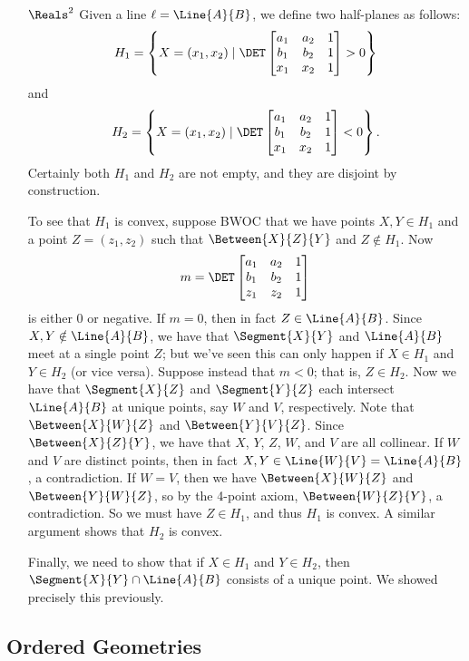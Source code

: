 \documentclass{article}
\begin{document}
\begin{itemize}
\item[$\Reals^2$] Given a line $\ell = \Line{A}{B}$, we define two half-planes as follows: \[ H_1 = \left\{ X = (x_1, x_2) \mid \DET \begin{bmatrix} a_1 & a_2 & 1 \\ b_1 & b_2 & 1 \\ x_1 & x_2 & 1 \end{bmatrix} > 0 \right\} \] and \[ H_2 = \left\{ X = (x_1, x_2) \mid \DET \begin{bmatrix} a_1 & a_2 & 1 \\ b_1 & b_2 & 1 \\ x_1 & x_2 & 1 \end{bmatrix} < 0 \right\}. \] Certainly both $H_1$ and $H_2$ are not empty, and they are disjoint by construction.

To see that $H_1$ is convex, suppose BWOC that we have points $X,Y \in H_1$ and a point $Z = (z_1, z_2)$ such that $\Between{X}{Z}{Y}$ and $Z \notin H_1$. Now \[ m = \DET \begin{bmatrix} a_1 & a_2 & 1 \\ b_1 & b_2 & 1 \\ z_1 & z_2 & 1 \end{bmatrix} \] is either 0 or negative. If $m = 0$, then in fact $Z \in \Line{A}{B}$. Since $X,Y \notin \Line{A}{B}$, we have that $\Segment{X}{Y}$ and $\Line{A}{B}$ meet at a single point $Z$; but we've seen this can only happen if $X \in H_1$ and $Y \in H_2$ (or vice versa). Suppose instead that $m < 0$; that is, $Z \in H_2$. Now we have that $\Segment{X}{Z}$ and $\Segment{Y}{Z}$ each intersect $\Line{A}{B}$ at unique points, say $W$ and $V$, respectively. Note that $\Between{X}{W}{Z}$ and $\Between{Y}{V}{Z}$. Since $\Between{X}{Z}{Y}$, we have that $X$, $Y$, $Z$, $W$, and $V$ are all collinear. If $W$ and $V$ are distinct points, then in fact $X, Y \in \Line{W}{V} = \Line{A}{B}$, a contradiction. If $W = V$, then we have $\Between{X}{W}{Z}$ and $\Between{Y}{W}{Z}$, so by the 4-point axiom, $\Between{W}{Z}{Y}$, a contradiction. So we must have $Z \in H_1$, and thus $H_1$ is convex. A similar argument shows that $H_2$ is convex.

Finally, we need to show that if $X \in H_1$ and $Y \in H_2$, then $\Segment{X}{Y} \cap \Line{A}{B}$ consists of a unique point. We showed precisely this previously.
\end{itemize}

\subsection*{Ordered Geometries}
\end{document}
